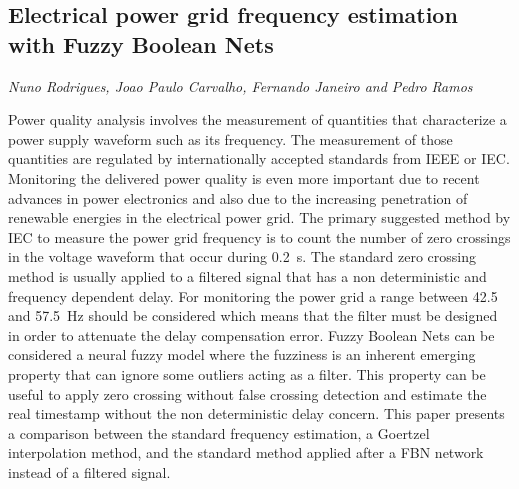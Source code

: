 \documentclass[../booklet.tex]{subfiles}
\begin{document}
\subsection[Electrical power grid frequency estimation with Fuzzy Boolean Nets. {\it Nuno Rodrigues, Joao Paulo Carvalho, Fernando Janeiro and Pedro Ramos}]{Electrical power grid frequency estimation with Fuzzy Boolean Nets}
   

\begin{center}
  {\it Nuno Rodrigues, Joao Paulo Carvalho, Fernando Janeiro and Pedro Ramos}
\end{center}



Power quality analysis involves the measurement of quantities that characterize a power supply waveform such as its frequency. The measurement of those quantities are regulated by internationally accepted standards from IEEE or IEC. Monitoring the delivered power quality is even more important due to recent advances in power electronics and also due to the increasing penetration of renewable energies in the electrical power grid. The primary suggested method by IEC to measure the power grid frequency is to count the number of zero crossings in the voltage waveform that occur during 0.2~s. The standard zero crossing method is usually applied to a filtered signal that has a non deterministic and frequency dependent delay. For monitoring the power grid a range between 42.5 and 57.5~Hz should be considered which means that the filter must be designed in order to attenuate the delay compensation error. Fuzzy Boolean Nets can be considered a neural fuzzy model where the fuzziness is an inherent emerging property that can ignore some outliers acting as a filter. This property can be useful to apply zero crossing without false crossing detection and estimate the real timestamp without the non deterministic delay concern. This paper presents a comparison between the standard frequency estimation, a Goertzel interpolation method, and the standard method applied after a FBN network instead of a filtered signal.

\end{document}
